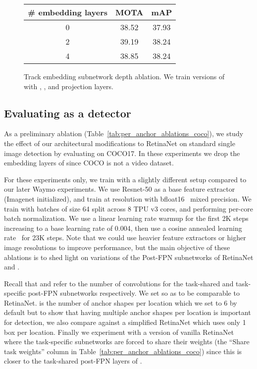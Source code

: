 \vspace{-2mm}
\begin{figure}
    \centering\small
    \begin{tabular}{c|c|c}
        \# embedding layers & MOTA & mAP  \\
        \hline
        0 & 38.52 & 37.93 \\
        2 & 39.19 & 38.24  \\
        4 & 38.85 & 38.24  
    \end{tabular}\vspace{-2mm}
    \caption{\footnotesize  Track embedding subnetwork
    depth ablation. 
    We train versions of \modelname with , , and  projection layers.}\vspace{-3mm}
    \label{fig:depth_ablation}
\end{figure}




\subsection{Evaluating \modelname as a  detector}
\vspace{-1mm}

As a preliminary ablation (Table~\ref{tab:per_anchor_ablations_coco}), 
we study the effect of our architectural 
modifications to RetinaNet on standard single image detection by 
evaluating on COCO17.  In these experiments we drop the embedding layers
of \modelname since COCO is not a video dataset.

For these experiments only, 
we train with a slightly different setup compared to our later
Waymo experiments.  We use Resnet-50 as a base feature extractor
(Imagenet initialized),
and train at  resolution with 
bfloat16~\cite{wang2019} mixed precision. 
We train with batches of size 64 split across 8 TPU v3 cores,
and performing per-core batch normalization.
We use a linear learning rate warmup for the first 2K steps increasing to a base learning rate of 0.004, then use a cosine annealed learning rate~\cite{loshchilov2016sgdr} 
for 23K steps.
Note that we could use 
heavier feature extractors or higher image resolutions 
to improve performance, but the main objective of these ablations is to shed
light on variations of the Post-FPN subnetworks of RetinaNet and
\modelname.


Recall that  and  refer to the number of convolutions 
 for the task-shared and task-specific post-FPN subnetworks
respectively.  
We set  so as to be comparable to RetinaNet.   is the number of anchor
shapes per location which we set to 6 by default but to show that
having multiple anchor shapes per location is important for detection, we also
compare against
a simplified RetinaNet which uses only 1 box per location.
Finally we experiment with a version of vanilla RetinaNet 
where the task-specific subnetworks are forced to share their
weights (the ``Share task weights'' column in Table~\ref{tab:per_anchor_ablations_coco}) since this is
closer to the task-shared post-FPN layers of  \modelname.


